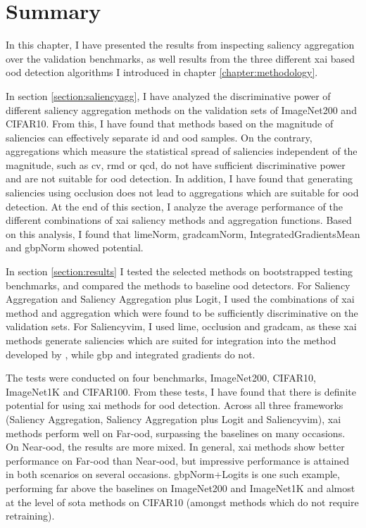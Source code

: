 \documentclass[UKenglish]{uiomasterthesis} %
\theoremstyle{definition}
\begin{document}
\section{Summary}

In this chapter, I have presented the results from inspecting saliency aggregation over the validation benchmarks, as well results from the three different \ac{xai} based \ac{ood} detection algorithms I introduced in chapter \ref{chapter:methodology}.

In section \ref{section:saliencyagg}, I have analyzed the discriminative power of different saliency aggregation methods on the validation sets of ImageNet200 and CIFAR10. From this, I have found that methods based on the magnitude of saliencies can effectively separate \ac{id} and \ac{ood} samples. On the contrary, aggregations which measure the statistical spread of saliencies independent of the magnitude, such as \ac{cv}, \ac{rmd} or \ac{qcd}, do not have sufficient discriminative power and are not suitable for \ac{ood} detection. In addition, I have found that generating saliencies using occlusion does not lead to aggregations which are suitable for \ac{ood} detection. At the end of this section, I analyze the average performance of the different combinations of \ac{xai} saliency methods and aggregation functions. Based on this analysis, I found that \ac{lime}Norm, \ac{gradcam}Norm, IntegratedGradientsMean and \ac{gbp}Norm showed potential.

In section \ref{section:results} I tested the selected methods on bootstrapped testing benchmarks, and compared the methods to baseline \ac{ood} detectors. For Saliency Aggregation and Saliency Aggregation plus Logit, I used the combinations of \ac{xai} method and aggregation which were found to be sufficiently discriminative on the validation sets. For Saliency\ac{vim}, I used \ac{lime}, occlusion and \ac{gradcam}, as these \ac{xai} methods generate saliencies which are suited for integration into the method developed by \cite{vim}, while \ac{gbp} and integrated gradients do not. 

The tests were conducted on four benchmarks, ImageNet200, CIFAR10, ImageNet1K and  CIFAR100. From these tests, I have found that there is definite potential for using \ac{xai} methods for \ac{ood} detection. Across all three frameworks (Saliency Aggregation, Saliency Aggregation plus Logit and Saliency\ac{vim}), \ac{xai} methods perform well on Far-\ac{ood}, surpassing the baselines on many occasions. On Near-\ac{ood}, the results are more mixed.  In general, \ac{xai} methods show better performance on Far-\ac{ood} than Near-\ac{ood}, but impressive performance is attained in both scenarios on several occasions. \ac{gbp}Norm+Logits is one such example, performing far above the baselines on ImageNet200 and ImageNet1K and almost at the level of \ac{sota} methods on CIFAR10 (amongst methods which do not require retraining).
\end{document}
